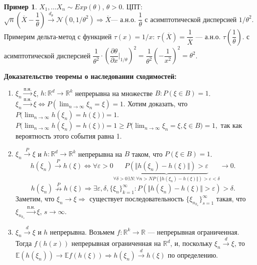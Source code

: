 \documentclass[12pt]{report}
\newcommand\setItemnumber[1]{\setcounter{enumi}{\numexpr#1-1\relax}}
\theoremstyle{definition}
\newtheorem{example}{Пример}
\begin{document}
\begin{example}
	$X_1,\dots X_n \sim Exp(\theta)$, $\theta > 0$. ЦПТ:
$$\sqrt{n}\left(\overline{X} - \dfrac{1}{\theta}\right) \xrightarrow{d_\theta} \mathcal{N}(0, 1/\theta^2) \Rightarrow \overline{X} \text{— а.н.о. } \frac{1}{\theta} \text{ с асимптотической дисперсией }1/\theta^2.$$
Примерим дельта-метод с функцией $\tau(x) = 1/x$: $\tau(\overline{X}) = \dfrac{1}{\overline{X}}$ — а.н.о. $\tau\left(\dfrac{1}{\theta}\right)$. с асимптотической дисперсией $\dfrac{1}{\theta^2}\cdot \left(\dfrac{\partial \theta}{\partial x}\Biggr\rvert_{1/\theta}\right)^2 = \dfrac{1}{\theta^2}\left(-\dfrac{1}{x^2}\right)^2 = \theta^2$.
\end{example}

\textbf{Доказательство теоремы о наследовании сходимостей:}\\
\begin{enumerate}
	\setItemnumber{2}
	\item $\xi_n\xrightarrow{п.н.} \xi$, $h:\mathbb{R}^d \rightarrow \mathbb{R}^k$ непрерывна на множестве $B:P(\xi \in B) = 1$. $\xi_n \xrightarrow{п. н.} \xi \Leftrightarrow P(\displaystyle{\lim_{n \to \infty} \xi_n = \xi}) = 1$. Хотим доказать, что $P(\displaystyle{\lim_{n \to \infty} h(\xi_n) =h(\xi)) = 1}$. $P(\displaystyle{\lim_{n \to \infty} h(\xi_n) =h(\xi)) = 1} \geqslant P(\displaystyle{\lim_{n \to \infty}\xi_n = \xi, \xi \in B) = 1},$ так как вероятность этого события равна 1.
	\setItemnumber{1}
	\item $\xi_n \xrightarrow{P} \xi$ и $h : \mathbb{R}^d \rightarrow \mathbb{R}^k$ непрерывна на $B$ таком, что $P(\xi \in B) = 1$. 
	$$h(\xi_n) \xrightarrow{P} h(\xi) \Leftrightarrow \forall \varepsilon > 0 \underbrace{P(\Vert h(\xi_n) - h(\xi)\Vert) > \varepsilon}_{\forall \delta > 0 \exists N : \forall n > N P(\Vert h(\xi_n)-h(\xi)\Vert) > \varepsilon < \delta} \rightarrow 0.$$
	$$h(\xi_n) \stackrel{P}{\nrightarrow} h(\xi) \Rightarrow \exists \varepsilon, \delta, \{\xi_n\}_{k=1}^\infty : P(\Vert h(\xi_n) - h(\xi) \Vert > \varepsilon) > \delta.$$ 
	Заметим, что $\xi_n \rightarrow \xi \Rightarrow$ существует последовательность $\{\xi_{n_{k_s}}\}_{s=1}^\infty$ такая, что $\xi_{n_{k_s}} \xrightarrow{п. н.} \xi$, $s \rightarrow \infty$.
	\setItemnumber{3}
	\item $\xi_n \xrightarrow{d} \xi$ и $h$ непрерывна. Возьмем $f : \mathbb{R}^k \rightarrow \mathbb{R}$ — непрерывная ограниченная. Тогда $f(h(x))$ непрерывная ограниченная на $\mathbb{R}^d$, и, поскольку $\xi_n \xrightarrow{d} \xi$, то $\mathbb{E}(h(\xi_n)) \rightarrow \mathbb{E}f(h(\xi)) \Rightarrow h(\xi_n) \xrightarrow{d} h(\xi)$ по определению. 

\end{enumerate}
\end{document}
